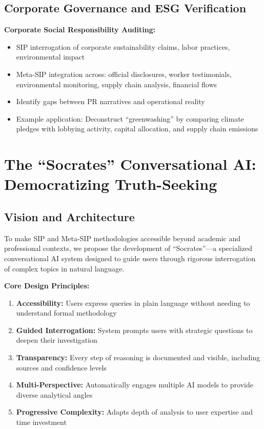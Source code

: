 \documentclass[11pt,a4paper]{article}
\begin{document}
\subsection{Corporate Governance and ESG Verification}

\textbf{Corporate Social Responsibility Auditing:}
\begin{itemize}[nosep]
    \item SIP interrogation of corporate sustainability claims, labor practices, environmental impact
    \item Meta-SIP integration across: official disclosures, worker testimonials, environmental monitoring, supply chain analysis, financial flows
    \item Identify gaps between PR narratives and operational reality
    \item Example application: Deconstruct ``greenwashing'' by comparing climate pledges with lobbying activity, capital allocation, and supply chain emissions
\end{itemize}

\section{The ``Socrates'' Conversational AI: Democratizing Truth-Seeking}

\subsection{Vision and Architecture}

To make SIP and Meta-SIP methodologies accessible beyond academic and professional contexts, we propose the development of ``Socrates''---a specialized conversational AI system designed to guide users through rigorous interrogation of complex topics in natural language.

\textbf{Core Design Principles:}
\begin{enumerate}[leftmargin=*]
    \item \textbf{Accessibility:} Users express queries in plain language without needing to understand formal methodology
    \item \textbf{Guided Interrogation:} System prompts users with strategic questions to deepen their investigation
    \item \textbf{Transparency:} Every step of reasoning is documented and visible, including sources and confidence levels
    \item \textbf{Multi-Perspective:} Automatically engages multiple AI models to provide diverse analytical angles
    \item \textbf{Progressive Complexity:} Adapts depth of analysis to user expertise and time investment
\end{enumerate}
\end{document}
